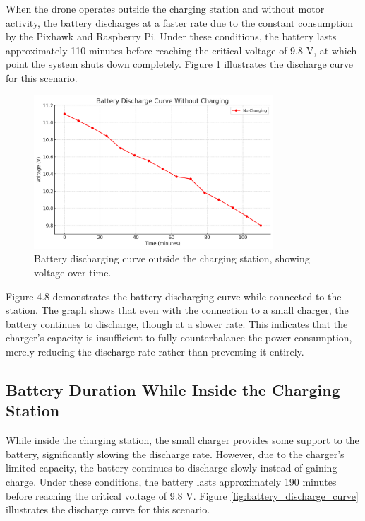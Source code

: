 When the drone operates outside the charging station and without motor activity, the battery discharges at a faster rate due to the constant consumption by the Pixhawk and Raspberry Pi. Under these conditions, the battery lasts approximately 110 minutes before reaching the critical voltage of 9.8 V, at which point the system shuts down completely. Figure \ref{fig:battery_charging_curve} illustrates the discharge curve for this scenario.

\begin{figure}[H] 
    \centering \includegraphics[width=0.8\textwidth]{pictures/Battery_Discharge_Outside.png} 
    \caption{Battery discharging curve outside the charging station, showing voltage over time.} 
    \label{fig:battery_charging_curve} 
\end{figure}

Figure 4.8 demonstrates the battery discharging curve while connected to the station. The graph shows that even with the connection to a small charger, the battery continues to discharge, though at a slower rate. This indicates that the charger's capacity is insufficient to fully counterbalance the power consumption, merely reducing the discharge rate rather than preventing it entirely.

\subsection{Battery Duration While Inside the Charging Station}

While inside the charging station, the small charger provides some support to the battery, significantly slowing the discharge rate. However, due to the charger’s limited capacity, the battery continues to discharge slowly instead of gaining charge. Under these conditions, the battery lasts approximately 190 minutes before reaching the critical voltage of 9.8 V. Figure \ref{fig:battery_discharge_curve} illustrates the discharge curve for this scenario.

